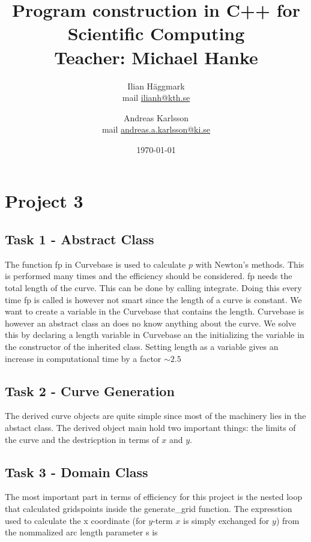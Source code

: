 \documentclass[paper=a4, fontsize=12pt]{article} %
\title{Program construction in C++ for Scientific Computing \\ Teacher: Michael Hanke}
\author{Ilian H{\"a}ggmark \\ mail \href{mailto:ilianh@kth.se}{ilianh@kth.se}
  \and Andreas Karlsson \\ mail \href{mailto:andreas.a.karlsson@ki.se}{andreas.a.karlsson@ki.se} }
\date{\normalsize\today} %
\begin{document}
\maketitle %

\section*{Project 3}
\subsection*{Task 1 - Abstract Class}

The function fp in Curvebase is used to calculate $p$ with Newton's methods. This is performed many times and the efficiency should be considered. fp needs the total length of the curve. This can be done by calling integrate. Doing this every time fp is called is however not smart since the length of a curve is constant. We want to create a variable in the Curvebase that contains the length. Curvebase is however an abstract class an does no know anything about the curve. We solve this by declaring a length variable in Curvebase an the initializing the variable in the constructor of the inherited class. Setting length as a variable gives an increase in computational time by a factor $\sim 2.5$\\



\subsection*{Task 2 - Curve Generation}

The derived curve objects are quite simple since most of the machinery lies in the abstact class. The derived object main hold two important things: the limits of the curve and the destricption in terms of $x$ and $y$.

\subsection*{Task 3 - Domain Class}

The most important part in terms of efficiency for this project is the nested loop that calculated gridspoints inside the generate\_grid function. The expresstion used to calculate the x coordinate (for $y$-term $x$ is simply exchanged for $y$) from the nommalized arc length parameter s is 
\end{document}
